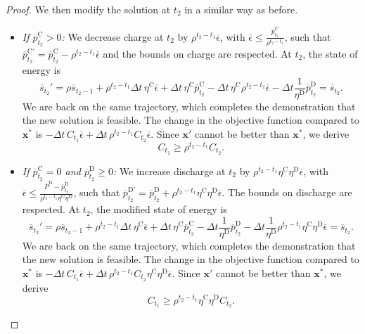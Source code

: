 \documentclass[10pt,a4paper]{amsart}
\newcommand{\up}[1]{^{\mathrm{#1}}}
\begin{document}
\begin{proof}
    We then modify the solution at $t_2$ in a similar way as before.
    \begin{itemize}
        \item \textit{If $\overline{p}\up{C}_{t_2}>0$: } We decrease charge at $t_2$ by $\rho^{t_2 - t_1} \overline{\epsilon}$, with $\overline{\epsilon} \leq \frac{\overline{p}\up{C}_{t_2}}{\rho^{t_2 - t_1}}$, such that $\overline{p}\up{C'}_{t_2}=\overline{p}\up{C}_{t_2}-\rho^{t_2 - t_1}\overline{\epsilon}$ and the bounds on charge are respected.
        At $t_2$, the state of energy is
        \begin{equation}
            \overline{s}_{t_2}' = \rho \overline{s}_{t_2-1} + \rho^{t_2 - t_1} \Delta t \, {\eta\up{C}} \overline{\epsilon} + \Delta t \, \eta\up{C} \overline{p}\up{C}_{t_2} - \Delta t \, \eta\up{C} \rho^{t_2 - t_1}\overline{\epsilon} - \Delta t \frac{1}{\eta\up{D}} \overline{p}\up{D}_{t_2} = \overline{s}_{t_2}.  
        \end{equation}
       We are back on the same trajectory, which completes the demonstration that the new solution is feasible. The change in the objective function compared to $\mathbf{x}^*$ is $- \Delta t \, C_{t_1} \overline{\epsilon} + \Delta t \, \rho^{t_2 - t_1} C_{t_2} \overline{\epsilon}$. Since $\mathbf{x}'$ cannot be better than $\mathbf{x}^*$, we derive
       \begin{equation} \label{eq:overline_pc_pc}
            C_{t_1} \geq \rho^{t_2 - t_1} C_{t_2}.
        \end{equation}
        \item \textit{If $\overline{p}\up{C}_{t_2}=0$ and $\overline{p}\up{D}_{t_2}\geq0$:} We increase discharge at $t_2$ by $\rho^{t_2 - t_1} {\eta\up{C} \eta\up{D}} \overline{\epsilon}$, with $\overline{\epsilon} \leq \frac{\overline{P}\up{D} - \overline{p}\up{D}_{t_2}}{\rho^{t_2 - t_1} \eta\up{C} \eta\up{D}}$, such that $\overline{p}\up{D'}_{t_2}=\overline{p}\up{D}_{t_2}+\rho^{t_2 - t_1} {\eta\up{C} \eta\up{D}}\overline{\epsilon}$. The bounds on discharge are respected.
        At $t_2$, the modified state of energy is 
        \begin{equation}
            \overline{s}_{t_2}' = \rho \overline{s}_{t_2-1} + \rho^{t_2 - t_1} \Delta t \, {\eta\up{C}} \overline{\epsilon} + \Delta t \, \eta\up{C} \overline{p}\up{C}_{t_2} - \Delta t \frac{1}{\eta\up{D}} \overline{p}\up{D}_{t_2} - \Delta t \frac{1}{\eta\up{D}} \rho^{t_2 - t_1} {\eta\up{C} \eta\up{D}} \overline{\epsilon} = \overline{s}_{t_2}.
        \end{equation}
        We are back on the same trajectory, which completes the demonstration that the new solution is feasible. The change in the objective function compared to $\mathbf{x}^*$ is $- \Delta t \, C_{t_1} \overline{\epsilon} + \Delta t \,\rho^{t_2 - t_1} C_{t_2} {\eta\up{C} \eta\up{D}} \overline{\epsilon}$. Since $\mathbf{x}'$ cannot be better than $\mathbf{x}^*$, we derive
        \begin{equation} \label{eq:overline_pc_pd}
            C_{t_1} \geq \rho^{t_2 - t_1} \eta\up{C} \eta\up{D} C_{t_2}.
        \end{equation}
    \end{itemize}
    

\end{proof}
\end{document}
